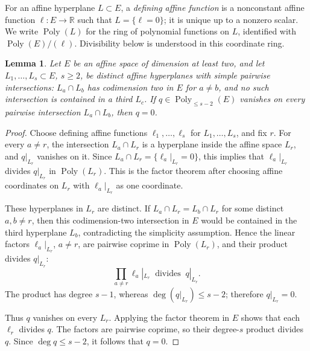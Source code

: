 \documentclass[10pt,a4paper]{amsart}
\newtheorem{lemma}[theorem]{Lemma}
\newcommand{\R}{\mathbb R}
\begin{document}
For an affine hyperplane \(L\subset E\), a \emph{defining affine function} is a
nonconstant affine function \(\ell:E\to\R\) such that \(L=\{\ell=0\}\); it is
unique up to a nonzero scalar.  We write \(\operatorname{Poly}(L)\) for the
ring of polynomial functions on \(L\), identified with
\(\operatorname{Poly}(E)/(\ell)\).  Divisibility below is understood in this
coordinate ring.

\begin{lemma}
\label{lem:hermite-arrangement}
Let \(E\) be an affine space of dimension at least two, and let
\(L_1,\ldots,L_s\subset E\), \(s\ge2\), be distinct affine hyperplanes with
simple pairwise intersections: \(L_a\cap L_b\) has codimension two in \(E\)
for \(a\ne b\), and no such intersection is contained in a third \(L_c\).
If \(q\in \operatorname{Poly}_{\le s-2}(E)\) vanishes on every pairwise
intersection \(L_a\cap L_b\), then \(q=0\).
\end{lemma}

\begin{proof}
Choose defining affine functions \(\ell_1,\ldots,\ell_s\) for
\(L_1,\ldots,L_s\), and fix \(r\).  For every \(a\ne r\), the intersection
\(L_a\cap L_r\) is a hyperplane inside the affine space \(L_r\), and
\(q|_{L_r}\) vanishes on it.  Since
\(L_a\cap L_r=\{\ell_a|_{L_r}=0\}\), this implies that
\(\ell_a|_{L_r}\) divides \(q|_{L_r}\) in \(\operatorname{Poly}(L_r)\).
This is the factor theorem after choosing affine coordinates on \(L_r\) with
\(\ell_a|_{L_r}\) as one coordinate.

These hyperplanes in \(L_r\) are distinct.  If
\(L_a\cap L_r=L_b\cap L_r\) for some distinct \(a,b\ne r\), then this
codimension-two intersection in \(E\) would be contained in the third
hyperplane \(L_b\), contradicting the simplicity assumption.  Hence the linear
factors \(\ell_a|_{L_r}\), \(a\ne r\), are pairwise coprime in
\(\operatorname{Poly}(L_r)\), and their product divides \(q|_{L_r}\):
\begin{equation}
  \prod_{a\ne r}\ell_a|_{L_r}\;\;\text{divides}\;\;q|_{L_r}.
\end{equation}
The product has degree \(s-1\), whereas \(\deg(q|_{L_r})\le s-2\); therefore
\(q|_{L_r}=0\).

Thus \(q\) vanishes on every \(L_r\).  Applying the factor theorem in \(E\)
shows that each \(\ell_r\) divides \(q\).  The factors are pairwise coprime, so
their degree-\(s\) product divides \(q\).  Since \(\deg q\le s-2\), it follows
that \(q=0\).
\end{proof}
\end{document}
